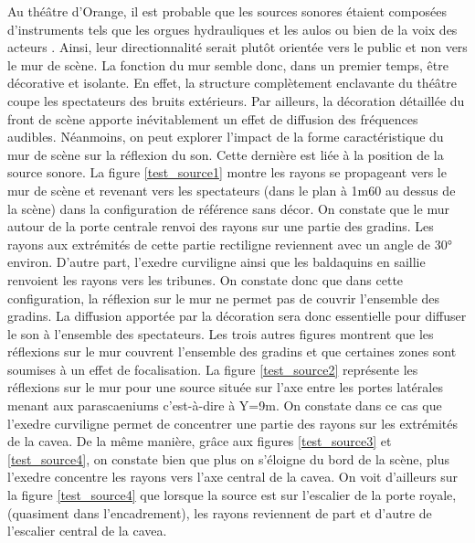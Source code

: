Au théâtre d'Orange, il est probable que les sources sonores étaient composées d'instruments tels que les orgues hydrauliques \cite[p.65]{rocconi} et les \gls{aulos} \cite[p.33]{rocconi} ou bien de la voix des acteurs \cite[]{voixRomain}. Ainsi, leur directionnalité serait plutôt orientée vers le public et non vers le mur de scène. La fonction du mur semble donc, dans un premier temps, être décorative et isolante. En effet, la structure complètement enclavante du théâtre coupe les spectateurs des bruits extérieurs. Par ailleurs, la décoration détaillée du front de scène apporte inévitablement un effet de diffusion des fréquences audibles. Néanmoins, on peut explorer l'impact de la forme caractéristique du mur de scène sur la réflexion du son. Cette dernière est liée à la position de la source sonore. La figure \ref{test_source1} montre les rayons se propageant vers le mur de scène et revenant vers les spectateurs (dans le plan à 1m60 au dessus de la scène) dans la configuration de référence sans décor. On constate que le mur autour de la porte centrale renvoi des rayons sur une partie des gradins. Les rayons aux extrémités de cette partie rectiligne reviennent avec un angle de 30° environ. D'autre part, l'\gls{exedre} curviligne ainsi que les baldaquins en saillie renvoient les rayons vers les tribunes. On constate donc que dans cette configuration, la réflexion sur le mur ne permet pas de couvrir l'ensemble des gradins. La diffusion apportée par la décoration sera donc essentielle pour diffuser le son à l'ensemble des spectateurs. Les trois autres figures montrent que les réflexions sur le mur couvrent l'ensemble des gradins et que certaines zones sont soumises à un effet de focalisation. La figure \ref{test_source2} représente les réflexions sur le mur pour une source située sur l'axe entre les portes latérales menant aux \glspl{parascaenium} c'est-à-dire à Y=9m. On constate dans ce cas que l'\gls{exedre} curviligne permet de concentrer une partie des rayons sur les extrémités de la \gls{cavea}. De la même manière, grâce aux figures \ref{test_source3} et \ref{test_source4}, on constate bien que plus on s'éloigne du bord de la scène, plus l'\gls{exedre} concentre les rayons vers l'axe central de la \gls{cavea}. On voit d'ailleurs sur la figure \ref{test_source4} que lorsque la source est sur l'escalier de la porte royale, (quasiment dans l'encadrement), les rayons reviennent de part et d'autre de l'escalier central de la \gls{cavea}. 

